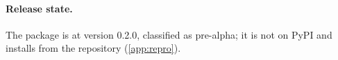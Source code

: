 \paragraph{Release state.}
The package is at version 0.2.0, classified as pre-alpha; it is not on PyPI and installs from the
repository (\cref{app:repro}). %
